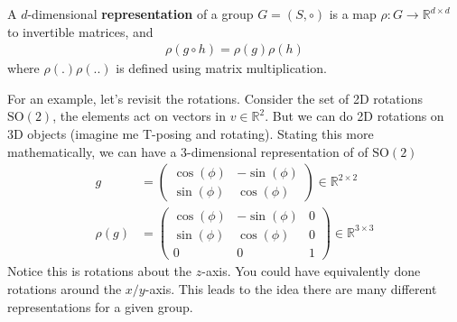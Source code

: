 \begin{definition}
	[Representation] A $d$-dimensional \textbf{representation} of a group $G = (S,\circ)$ is a map $\rho : G \to \mathbb R^{d \times d}$  to invertible matrices, and  \begin{align}\rho(g \circ h) = \rho(g) \rho(h)\end{align} where $\rho(.) \rho(..)$ is defined using matrix multiplication.
\end{definition}
For an example, let's revisit the rotations. Consider the set of 2D rotations $\text{SO}(2)$, the elements act on vectors in $v \in \mathbb R^2$. But we can do 2D rotations on 3D objects (imagine me T-posing and rotating). Stating this more mathematically, we can have a 3-dimensional representation of of $\text{SO}(2)$
\begin{align*}
	g & = \begin{pmatrix}
	\cos(\phi) & - \sin(\phi) \\ \sin(\phi) & \cos(\phi) \end{pmatrix} \in \mathbb R^{2 \times 2}\\
	\rho(g) & = \begin{pmatrix} \cos(\phi) & - \sin(\phi) & 0 \\ \sin(\phi) & \cos(\phi)& 0\\ 0 & 0 & 1 \end{pmatrix} \in \mathbb R^{3 \times 3}
\end{align*}
Notice this is rotations about the $z$-axis. You could have equivalently done rotations around the $x/y$-axis. This leads to the idea there are many different representations for a given group.


